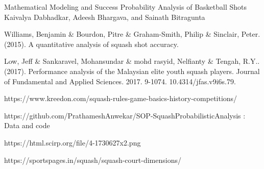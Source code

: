 \documentclass[10pt,conference]{IEEEtran}
\newcommand{\hide}[1]{\ifthenelse{\boolean{false}}{#1}{}}
\begin{document}
\begin{thebibliography}{10}

Mathematical Modeling and Success Probability Analysis of Basketball Shots
Kaivalya Dabhadkar, Adeesh Bhargava, and Sainath Bitragunta

Williams, Benjamin \& Bourdon, Pitre \& Graham-Smith, Philip \& Sinclair, Peter. (2015). A quantitative analysis of squash shot accuracy. 

Low, Jeff \& Sankaravel, Mohansundar \& mohd rasyid, Nelfianty \& Tengah, R.Y.. (2017). Performance analysis of the Malaysian elite youth squash players. Journal of Fundamental and Applied Sciences. 2017. 9-1074. 10.4314/jfas.v9i6s.79. 

https://www.kreedon.com/squash-rules-game-basics-history-competitions/

https://github.com/PrathameshAnwekar/SOP-SquashProbabilisticAnalysis : Data and code

https://html.scirp.org/file/4-1730627x2.png

https://sportspages.in/squash/squash-court-dimensions/

\end{thebibliography}
\end{document}
